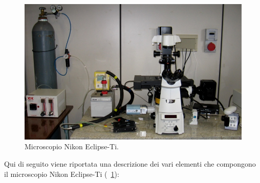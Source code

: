 \begin{figure}
 \centering
 \includegraphics[scale=.45]{img/CAP2microNIKON.png}
 \caption{\small{Microscopio Nikon Eclipse-Ti.}}
 \label{fig:NIKON}
\end{figure}

Qui di seguito viene riportata una descrizione dei vari elementi che compongono il microscopio Nikon Eclipse-Ti (\figurename~\ref{fig:NIKON}):

